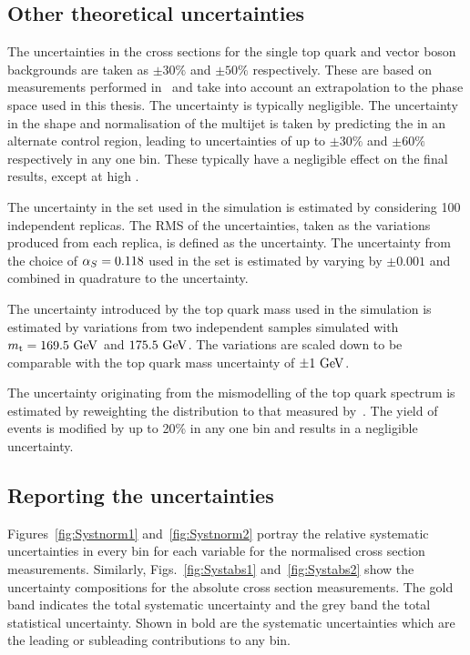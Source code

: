 
\subsection{Other theoretical uncertainties} %
\label{sub:other_theoretical_uncertainties}

The uncertainties in the cross sections for the single top quark and vector boson backgrounds are taken as $\pm30\%$ and $\pm50\%$ respectively.
These are based on measurements performed in~\cite{Sys:ST, Sys:W, Sys:Z} and take into account an extrapolation to the phase space used in this thesis.
The uncertainty is typically negligible.
The uncertainty in the shape and normalisation of the multijet \QCD{} is taken by predicting the \QCD{} in an alternate control region, leading to uncertainties of up to $\pm30\%$ and $\pm60\%$ respectively in any one bin.
These typically have a negligible effect on the final results, except at high \LETA{}.

The uncertainty in the \nnpdf{} \PDF{} set used in the \powhegpythia{} simulation is estimated by considering 100 independent replicas.
The RMS of the uncertainties, taken as the variations produced from each replica, is defined as the \PDF{} uncertainty.
The uncertainty from the choice of $\alpha_S = 0.118$ used in the \nnpdf{} set is estimated by varying \alpS{} by $\pm 0.001$ and combined in quadrature to the \PDF{} uncertainty.

The uncertainty introduced by the top quark mass used in the \ttbar{} simulation is estimated by variations from two independent samples simulated with $m_{\mathrm{t}} = 169.5\mathrm{~Ge\hspace{-.08em}V}^{}$ and $175.5\mathrm{~Ge\hspace{-.08em}V}^{}$.
The variations are scaled down to be comparable with the top quark mass uncertainty of $\pm1\mathrm{~Ge\hspace{-.08em}V}^{}$\cite{PDG}.

The uncertainty originating from the mismodelling of the top quark \pt{} spectrum is estimated by reweighting the \pt{} distribution to that measured by~\cite{TOP16007,TOP16008}.
The yield of \ttbar{} events is modified by up to 20\% in any one bin and results in a negligible uncertainty.

\subsection{Reporting the uncertainties} %
\label{sub:reporting_the_uncertainties}

Figures~\ref{fig:Systnorm1} and~\ref{fig:Systnorm2} portray the relative systematic uncertainties in every bin for each variable for the normalised cross section measurements.
Similarly, Figs.~\ref{fig:Systabs1} and~\ref{fig:Systabs2} show the uncertainty compositions for the absolute cross section measurements.
The gold band indicates the total systematic uncertainty and the grey band the total statistical uncertainty.
Shown in bold are the systematic uncertainties which are the leading or subleading contributions to any bin.

